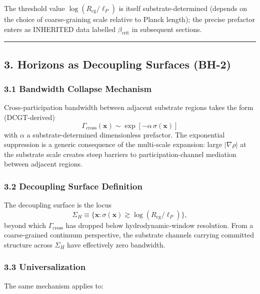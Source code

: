 \documentclass[
  11pt,
  a4paper,
]{article}
\begin{document}
The threshold value \(\log(R_\mathrm{cg}/\ell_P)\) is itself
substrate-determined (depends on the choice of coarse-graining scale
relative to Planck length); the precise prefactor enters as INHERITED
data labelled \(\beta_\mathrm{crit}\) in subsequent sections.

\begin{center}\rule{0.5\linewidth}{0.5pt}\end{center}

\subsection{3. Horizons as Decoupling Surfaces
(BH-2)}\label{horizons-as-decoupling-surfaces-bh-2}

\subsubsection{3.1 Bandwidth Collapse
Mechanism}\label{bandwidth-collapse-mechanism}

Cross-participation bandwidth between adjacent substrate regions takes
the form (DCGT-derived) \[
\Gamma_\mathrm{cross}(\mathbf{x}) \sim \exp\!\left[-\alpha\,\sigma(\mathbf{x})\right]
\] with \(\alpha\) a substrate-determined dimensionless prefactor. The
exponential suppression is a generic consequence of the multi-scale
expansion: large \(|\nabla\rho|\) at the substrate scale creates steep
barriers to participation-channel mediation between adjacent regions.

\subsubsection{3.2 Decoupling Surface
Definition}\label{decoupling-surface-definition}

The decoupling surface is the locus \[
\Sigma_H \equiv \{\mathbf{x}: \sigma(\mathbf{x}) \gtrsim \log(R_\mathrm{cg}/\ell_P)\},
\] beyond which \(\Gamma_\mathrm{cross}\) has dropped below
hydrodynamic-window resolution. From a coarse-grained continuum
perspective, the substrate channels carrying committed structure across
\(\Sigma_H\) have effectively zero bandwidth.

\subsubsection{3.3 Universalization}\label{universalization}

The same mechanism applies to:
\end{document}

